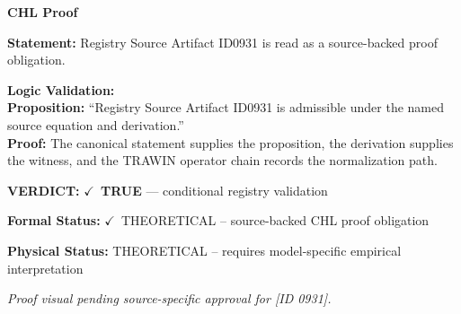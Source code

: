 \vspace{0.45em}
\noindent\textbf{CHL Proof}\par
\textbf{Statement:} Registry Source Artifact ID0931 is read as a source-backed proof obligation.

\textbf{Logic Validation:}\\
\textbf{Proposition:} ``Registry Source Artifact ID0931 is admissible under the named source equation and derivation.''\\
\textbf{Proof:} The canonical statement supplies the proposition, the derivation supplies the witness, and the TRAWIN operator chain records the normalization path.

\textbf{VERDICT:} \ensuremath{\checkmark}\ \textbf{TRUE} --- conditional registry validation

\textbf{Formal Status:} \ensuremath{\checkmark}\ THEORETICAL -- source-backed CHL proof obligation

\textbf{Physical Status:} THEORETICAL -- requires model-specific empirical interpretation
\par\vspace{0.45em}
\par
\vfill
\begingroup\footnotesize\itshape
Proof visual pending source-specific approval for [ID 0931].
\par\endgroup
\vfill
\endgroup
\endgroup
